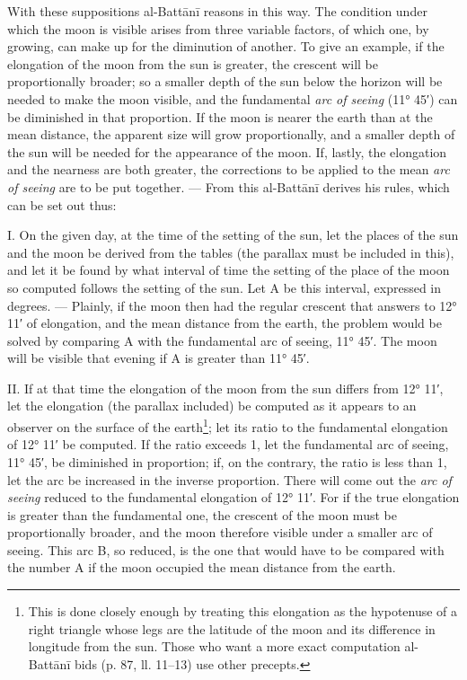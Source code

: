 \documentclass[11pt]{article}
\newcommand{\Pg}[1]{\marginpar{\footnotesize\color{gray}#1}}
\begin{document}
\par \Pg{I 268}With these suppositions al-Battānī reasons in this way. The condition under which the moon is visible arises from three variable factors, of which one, by growing, can make up for the diminution of another. To give an example, if the elongation of the moon from the sun is greater, the crescent will be proportionally broader; so a smaller depth of the sun below the horizon will be needed to make the moon visible, and the fundamental \emph{arc of seeing} (11° 45′) can be diminished in that proportion. If the moon is nearer the earth than at the mean distance, the apparent size will grow proportionally, and a smaller depth of the sun will be needed for the appearance of the moon. If, lastly, the elongation and the nearness are both greater, the corrections to be applied to the mean \emph{arc of seeing} are to be put together. — From this al-Battānī derives his rules, which can be set out thus:\par
\par I. On the given day, at the time of the setting of the sun, let the places of the sun and the moon be derived from the tables (the parallax must be included in this), and let it be found by what interval of time the setting of the place of the moon so computed follows the setting of the sun. Let A be this interval, expressed in degrees. — Plainly, if the moon then had the regular crescent that answers to 12° 11′ of elongation, and the mean distance from the earth, the problem would be solved by comparing A with the fundamental arc of seeing, 11° 45′. The moon will be visible that evening if A is greater than 11° 45′.\par
\par II. If at that time the elongation of the moon from the sun differs from 12° 11′, let the elongation (the parallax included) be computed as it appears to an observer on the surface of the earth\footnote{This is done closely enough by treating this elongation as the hypotenuse of a right triangle whose legs are the latitude of the moon and its difference in longitude from the sun. Those who want a more exact computation al-Battānī bids (p. 87, ll. 11–13) use other precepts.}; let its ratio to the fundamental elongation of 12° 11′ be computed. If the ratio exceeds 1, let the fundamental arc of seeing, 11° 45′, be diminished in proportion; if, on the contrary, the ratio is less than 1, let the arc be increased in the inverse proportion. There will come out the \emph{arc of seeing} reduced to the fundamental elongation of 12° 11′. For if the true elongation is greater than the fundamental one, the crescent of the moon must be proportionally broader, and the moon therefore visible under a smaller arc of seeing. This arc B, so reduced, is the one that would have to be compared with the number A if the moon occupied the mean distance from the earth.\par
\end{document}
